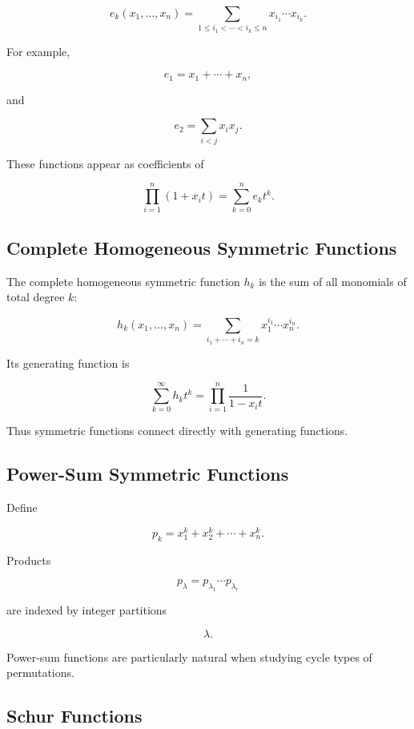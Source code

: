 \[
\boxed{
e_k(x_1,\ldots,x_n)
=
\sum_{1\leq i_1<\cdots<i_k\leq n}
x_{i_1}\cdots x_{i_k}.
}
\]

For example,

\[
e_1=x_1+\cdots+x_n,
\]

and

\[
e_2
=
\sum_{i<j}x_ix_j.
\]

These functions appear as coefficients of

\[
\boxed{
\prod_{i=1}^{n}(1+x_it)
=
\sum_{k=0}^{n}
e_k t^k.
}
\]

\subsection{Complete Homogeneous Symmetric Functions}
\label{subsec:complete-homogeneous-symmetric}

The complete homogeneous symmetric function \(h_k\) is the sum of all
monomials of total degree \(k\):

\[
\boxed{
h_k(x_1,\ldots,x_n)
=
\sum_{i_1+\cdots+i_n=k}
x_1^{i_1}\cdots x_n^{i_n}.
}
\]

Its generating function is

\[
\boxed{
\sum_{k=0}^{\infty}
h_k t^k
=
\prod_{i=1}^{n}
\frac{1}{1-x_it}.
}
\]

Thus symmetric functions connect directly with generating functions.

\subsection{Power-Sum Symmetric Functions}
\label{subsec:power-sum-symmetric}

Define

\[
\boxed{
p_k
=
x_1^k+x_2^k+\cdots+x_n^k.
}
\]

Products

\[
p_\lambda
=
p_{\lambda_1}\cdots p_{\lambda_r}
\]

are indexed by integer partitions

\[
\lambda.
\]

Power-sum functions are particularly natural when studying cycle types
of permutations.

\subsection{Schur Functions}
\label{subsec:schur-functions}

